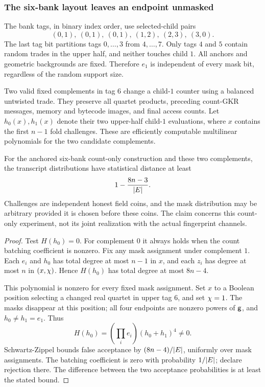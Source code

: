 \subsubsection{The six-bank layout leaves an endpoint unmasked}

The bank tags, in binary index order, use selected-child pairs
\[
 (0,1),\ (0,1),\ (0,1),\ (1,2),\ (2,3),\ (3,0).
\]
The last tag bit partitions tags $0,\ldots,3$ from $4,\ldots,7$. Only tags $4$ and $5$ contain random trades in the upper half, and neither touches child $1$. All anchors and geometric backgrounds are fixed. Therefore $e_1$ is independent of every mask bit, regardless of the random support size.

Two valid fixed complements in tag $6$ change a child-$1$ counter using a balanced untwisted trade. They preserve all quartet products, preceding count-GKR messages, memory and bytecode images, and final access counts. Let $h_0(x),h_1(x)$ denote their two upper-half child-$1$ evaluations, where $x$ contains the first $n-1$ fold challenges. These are efficiently computable multilinear polynomials for the two candidate complements.

\begin{proposition}
For the anchored six-bank count-only construction and these two complements, the transcript distributions have statistical distance at least
\[
 1-\frac{8n-3}{|E|}.
\]
Challenges are independent honest field coins, and the mask distribution may be arbitrary provided it is chosen before these coins. The claim concerns this count-only experiment, not its joint realization with the actual fingerprint channels.
\end{proposition}
\begin{proof}
Test $H(h_0)=0$. For complement $0$ it always holds when the count batching coefficient is nonzero. Fix any mask assignment under complement $1$. Each $e_i$ and $h_0$ has total degree at most $n-1$ in $x$, and each $z_i$ has degree at most $n$ in $(x,\chi)$. Hence $H(h_0)$ has total degree at most $8n-4$.

This polynomial is nonzero for every fixed mask assignment. Set $x$ to a Boolean position selecting a changed real quartet in upper tag $6$, and set $\chi=1$. The masks disappear at this position; all four endpoints are nonzero powers of $\mathsf{g}$, and $h_0\ne h_1=e_1$. Thus
\[
 H(h_0)=\left(\prod_i e_i\right)(h_0+h_1)^4\ne0.
\]
Schwartz-Zippel bounds false acceptance by $(8n-4)/|E|$, uniformly over mask assignments. The batching coefficient is zero with probability $1/|E|$; declare rejection there. The difference between the two acceptance probabilities is at least the stated bound.
\end{proof}

